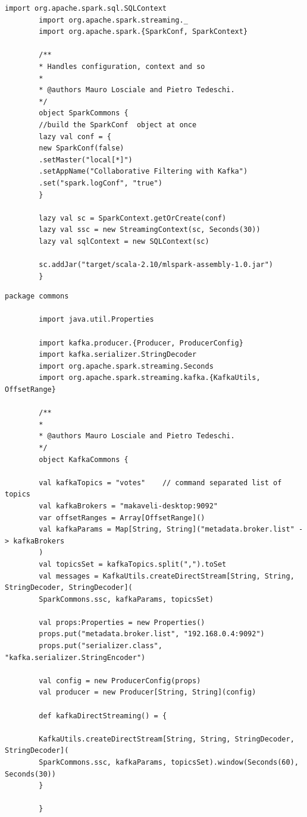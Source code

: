 \documentclass[12pt]{article}
\begin{document}
\begin{appendices}
\begin{lstlisting}[style=scalacode, caption=SparkCommons.scala]
		import org.apache.spark.sql.SQLContext
		import org.apache.spark.streaming._
		import org.apache.spark.{SparkConf, SparkContext}
		
		/**
		* Handles configuration, context and so
		*
		* @authors Mauro Losciale and Pietro Tedeschi.
		*/
		object SparkCommons {
		//build the SparkConf  object at once
		lazy val conf = {
		new SparkConf(false)
		.setMaster("local[*]")
		.setAppName("Collaborative Filtering with Kafka")
		.set("spark.logConf", "true")
		}
		
		lazy val sc = SparkContext.getOrCreate(conf)
		lazy val ssc = new StreamingContext(sc, Seconds(30))
		lazy val sqlContext = new SQLContext(sc)
		
		sc.addJar("target/scala-2.10/mlspark-assembly-1.0.jar")
		}
	\end{lstlisting}
	
	\begin{lstlisting}[style=scalacode, caption=KafkaCommons.scala]
		package commons
		
		import java.util.Properties
		
		import kafka.producer.{Producer, ProducerConfig}
		import kafka.serializer.StringDecoder
		import org.apache.spark.streaming.Seconds
		import org.apache.spark.streaming.kafka.{KafkaUtils, OffsetRange}
		
		/**
		*
		* @authors Mauro Losciale and Pietro Tedeschi.
		*/
		object KafkaCommons {
		
		val kafkaTopics = "votes"    // command separated list of topics
		val kafkaBrokers = "makaveli-desktop:9092"
		var offsetRanges = Array[OffsetRange]()
		val kafkaParams = Map[String, String]("metadata.broker.list" -> kafkaBrokers
		)
		val topicsSet = kafkaTopics.split(",").toSet
		val messages = KafkaUtils.createDirectStream[String, String, StringDecoder, StringDecoder](
		SparkCommons.ssc, kafkaParams, topicsSet)
		
		val props:Properties = new Properties()
		props.put("metadata.broker.list", "192.168.0.4:9092")
		props.put("serializer.class", "kafka.serializer.StringEncoder")
		
		val config = new ProducerConfig(props)
		val producer = new Producer[String, String](config)
		
		def kafkaDirectStreaming() = {
		
		KafkaUtils.createDirectStream[String, String, StringDecoder, StringDecoder](
		SparkCommons.ssc, kafkaParams, topicsSet).window(Seconds(60), Seconds(30))
		}
		
		}
		

\end{lstlisting}
\end{appendices}
\end{document}
